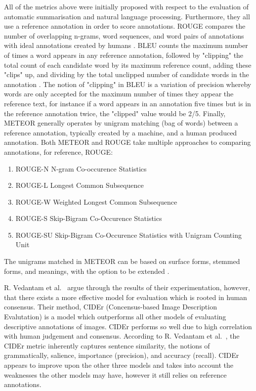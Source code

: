 \documentclass[12pt,a4paper]{article}
\begin{document}
All of the metrics above were initially proposed with respect to the evaluation of automatic summarisation and natural language processing. Furthermore, they all use a reference annotation in order to score annotations. ROUGE compares the number of overlapping n-grams, word sequences, and word pairs of annotations with ideal annotations created by humans \citep{lin2004rouge}. BLEU counts the maximum number of times a word appears in any reference annotation, followed by "clipping" the total count of each candidate word by its maximum reference count, adding these "clips" up, and dividing by the total unclipped number of candidate words in the annotation \citep{papineni2002bleu}. The notion of "clipping" in BLEU is a variation of precision whereby words are only accepted for the maximum number of times they appear the reference text, for instance if a word appears in an annotation five times but is in the reference annotation twice, the "clipped" value would be 2/5. Finally, METEOR generally operates by unigram matching (bag of words) between a reference annotation, typically created by a machine, and a human produced annotation. Both METEOR and ROUGE take multiple approaches to comparing annotations, for reference, ROUGE:
\begin{enumerate}
    \item ROUGE-N N-gram Co-occurence Statistics
    \item ROUGE-L Longest Common Subsequence
    \item ROUGE-W Weighted Longest Common Subsequence
    \item ROUGE-S Skip-Bigram Co-Occurence Statistics
    \item ROUGE-SU Skip-Bigram Co-Occurence Statistics with Unigram Counting Unit
\end{enumerate}
The unigrams matched in METEOR can be based on surface forms, stemmed forms, and meanings, with the option to be extended \citep{elliott2013image}.

R. Vedantam et al.~\citep{vedantam2015cider} argue through the results of their experimentation, however, that there exists a more effective model for evaluation which is rooted in human consensus. Their method, CIDEr (Concensus-based Image Description Evalutation) is a model which outperforms all other models of evaluating descriptive annotations of images. CIDEr performs so well due to high correlation with human judgement and consensus. According to R. Vedantam et al.~\cite{vedantam2015cider}, the CIDEr metric inherently captures sentence similarity, the notions of grammatically, salience, importance (precision), and accuracy (recall). CIDEr appears to improve upon the other three models and takes into account the weaknesses the other models may have, however it still relies on reference annotations.
\end{document}
